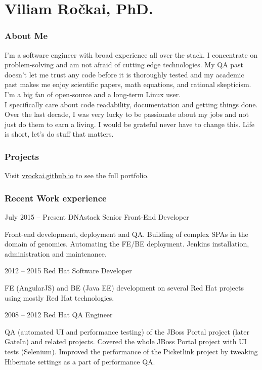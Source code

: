 \documentclass{tccv}
\begin{document}
\part{Viliam Ro\v{c}kai, PhD.}

\section{About Me}

I'm a software engineer with broad experience all over the stack. I concentrate on problem-solving and am not afraid of cutting edge technologies. My QA past doesn't let me trust any code before it is thoroughly tested and my academic past makes me enjoy scientific papers, math equations, and rational skepticism. I'm a big fan of open-source and a long-term Linux user.
\\

I specifically care about code readability, documentation and getting things done.
\\

Over the last decade, I was very lucky to be passionate about my jobs and not just do them to earn a living. I would be grateful never have to change this. Life is short, let's do stuff that matters.

\section{Projects}

Visit \href{https://vrockai.github.io/}{vrockai.github.io} to see the full portfolio.

\section{Recent Work experience}

\begin{eventlist}

\item{July 2015 -- Present}
     {DNAstack}
     {Senior Front-End Developer}

Front-end development, deployment and QA. Building of complex SPAs in the domain of genomics. 
Automating the FE/BE deployment. Jenkins installation, administration and maintenance.

\item{2012 -- 2015}
     {Red Hat}
     {Software Developer}

FE (AngularJS) and BE (Java EE) development on several Red Hat projects using mostly Red Hat technologies.

\item{2008 -- 2012}
     {Red Hat}
     {QA Engineer}

QA (automated UI and performance testing) of the JBoss Portal project (later GateIn) and related projects. Covered the whole JBoss Portal project with UI tests (Selenium). Improved the performance of the Picketlink project by tweaking Hibernate settings as a part of performance QA.

\end{eventlist}
\end{document}
